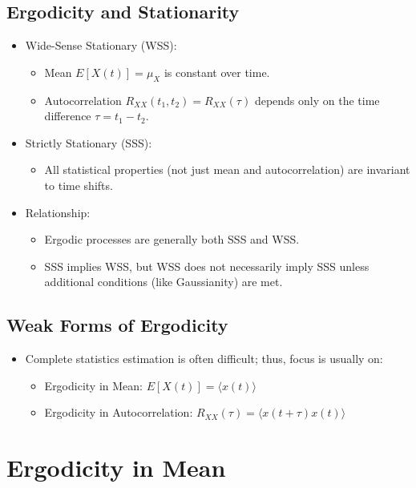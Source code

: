\documentclass[12pt]{article}
\begin{document}
\subsection{Ergodicity and Stationarity}
\begin{itemize}
    \item Wide-Sense Stationary (WSS):
    \begin{itemize}
        \item Mean \( E[X(t)] = \mu_X \) is constant over time.
        \item Autocorrelation \( R_{XX}(t_1, t_2) = R_{XX}(\tau) \) depends only on the time difference \( \tau = t_1 - t_2 \).
    \end{itemize}
    \item Strictly Stationary (SSS):
    \begin{itemize}
        \item All statistical properties (not just mean and autocorrelation) are invariant to time shifts.
    \end{itemize}
    \item Relationship:
    \begin{itemize}
        \item Ergodic processes are generally both SSS and WSS.
        \item SSS implies WSS, but WSS does not necessarily imply SSS unless additional conditions (like Gaussianity) are met.
    \end{itemize}
\end{itemize}

\subsection{Weak Forms of Ergodicity}
\begin{itemize}
    \item Complete statistics estimation is often difficult; thus, focus is usually on:
    \begin{itemize}
        \item Ergodicity in Mean: \( E[X(t)] = \langle x(t) \rangle \)
        \item Ergodicity in Autocorrelation: \( R_{XX}(\tau) = \langle x(t+\tau)x(t) \rangle \)
    \end{itemize}
\end{itemize}

\section{Ergodicity in Mean}
\end{document}
